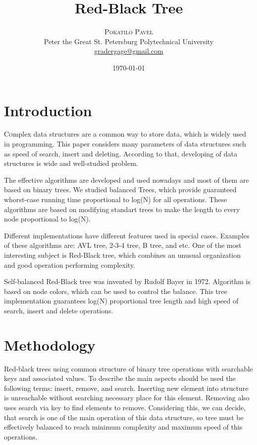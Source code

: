 \documentclass[twoside,twocolumn]{article}
\title{Red-Black Tree} %
\author{%
\textsc{Pokatilo Pavel}\\[1ex] %
\normalsize Peter the Great St. Petersburg Polytechnical University \\ %
\normalsize \href{mailto:gradergage@gmail.com}{gradergage@gmail.com} %
}
\date{\today} %
\begin{document}
\maketitle


\section{Introduction}

\lettrine[nindent=0em,lines=3]{C}omplex data structures are a common way to store data, which is widely used in programming. This paper considers many parameters of data structures such as speed of search, insert and deleting. According to that, developing of data structures is wide and well-studied problem.

The effective algorithms are developed and used nowadays and most of them are based on binary trees. We studied balanced Trees, which provide guaranteed whorst-case running time proportional to log(N) for all operations. These algorithms are based on modifying standart trees to make the length to every node proportional to log(N).

Different implementations have different features used in special cases. Examples of these algorithms are: AVL tree, 2-3-4 tree, B tree, and etc. One of the most interesting subject is Red-Black tree, which combines an unusual organization and good operation performing complexity.

Self-balanced Red-Black tree was invented by Rudolf Bayer in 1972. Algorithm is based on node colors, which can be used to control the balance. This tree implementation guarantees log(N) proportional tree length and high speed of search, insert and delete operations.

\section{Methodology}
Red-black trees using common structure of binary tree operations with searchable keys and associated values. To describe the main aspects should be used the following terms: insert, remove, and search. Inserting new element into structure is unreachable without searching necessary place for this element. Removing also uses search via key to find elements to remove. Considering this, we can decide, that search is one of the main operation of this data structure, so tree must be effectively balanced to reach minimum complexity and maximum speed of this operations. 
\end{document}
